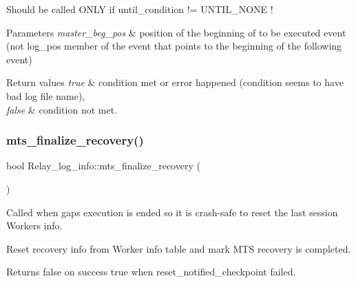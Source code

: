 Should be called O\+N\+LY if {\ttfamily until\+\_\+condition} {\ttfamily !=} {\ttfamily U\+N\+T\+I\+L\+\_\+\+N\+O\+NE} !


\begin{DoxyParams}{Parameters}
{\em master\+\_\+beg\+\_\+pos} & position of the beginning of to be executed event (not {\ttfamily log\+\_\+pos} member of the event that points to the beginning of the following event)\\
\hline
\end{DoxyParams}

\begin{DoxyRetVals}{Return values}
{\em true} & condition met or error happened (condition seems to have bad log file name), \\
\hline
{\em false} & condition not met. \\
\hline
\end{DoxyRetVals}
\mbox{\label{classRelay__log__info_ad2330aea71b42204dd5ee6461c30ef84}} 
\subsubsection{\texorpdfstring{mts\+\_\+finalize\+\_\+recovery()}{mts\_finalize\_recovery()}}
{\footnotesize\ttfamily bool Relay\+\_\+log\+\_\+info\+::mts\+\_\+finalize\+\_\+recovery (\begin{DoxyParamCaption}{ }\end{DoxyParamCaption})}

Called when gaps execution is ended so it is crash-\/safe to reset the last session Workers info.

Reset recovery info from Worker info table and mark M\+TS recovery is completed.

\begin{DoxyReturn}{Returns}
false on success true when {\ttfamily reset\+\_\+notified\+\_\+checkpoint} failed. 
\end{DoxyReturn}
\mbox{\label{classRelay__log__info_a8b38e96443b2adc87210a39ac7b831a8}} 
